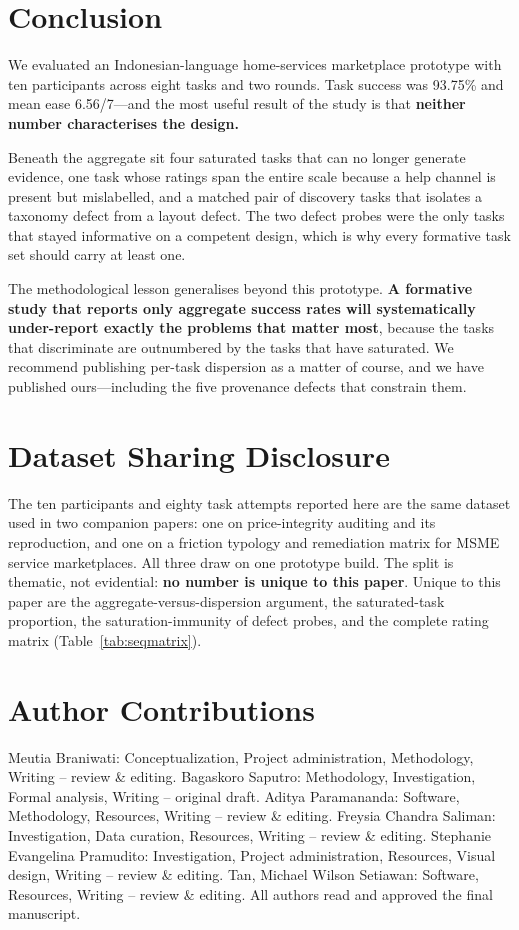 \documentclass[conference]{IEEEtran}
\begin{document}
\section{Conclusion}

We evaluated an Indonesian-language home-services marketplace prototype with
ten participants across eight tasks and two rounds. Task success was 93.75\%
and mean ease 6.56/7---and the most useful result of the study is that
\textbf{neither number characterises the design.}

Beneath the aggregate sit four saturated tasks that can no longer generate
evidence, one task whose ratings span the entire scale because a help channel is
present but mislabelled, and a matched pair of discovery tasks that isolates a
taxonomy defect from a layout defect. The two defect probes were the only tasks
that stayed informative on a competent design, which is why every formative task
set should carry at least one.

The methodological lesson generalises beyond this prototype. \textbf{A formative
study that reports only aggregate success rates will systematically
under-report exactly the problems that matter most}, because the tasks that
discriminate are outnumbered by the tasks that have saturated. We recommend
publishing per-task dispersion as a matter of course, and we have published
ours---including the five provenance defects that constrain them.

\section*{Dataset Sharing Disclosure}

The ten participants and eighty task attempts reported here are the same dataset
used in two companion papers: one on price-integrity auditing and its
reproduction, and one on a friction typology and remediation matrix for MSME
service marketplaces. All three draw on one prototype build. The split is
thematic, not evidential: \textbf{no number is unique to this paper}. Unique to
this paper are the aggregate-versus-dispersion argument, the saturated-task
proportion, the saturation-immunity of defect probes, and the complete rating
matrix (Table~\ref{tab:seqmatrix}).

\section*{Author Contributions}
Meutia Braniwati: Conceptualization, Project administration, Methodology,
Writing -- review \& editing. Bagaskoro Saputro: Methodology, Investigation, Formal analysis, Writing
-- original draft. Aditya Paramananda: Software, Methodology, Resources, Writing -- review \& editing.
Freysia Chandra Saliman: Investigation, Data curation, Resources, Writing -- review \& editing.
Stephanie Evangelina Pramudito: Investigation, Project administration, Resources, Visual design,
Writing -- review \& editing. Tan, Michael Wilson Setiawan: Software, Resources, Writing -- review \&
editing. All authors read and approved the final manuscript.
\end{document}
